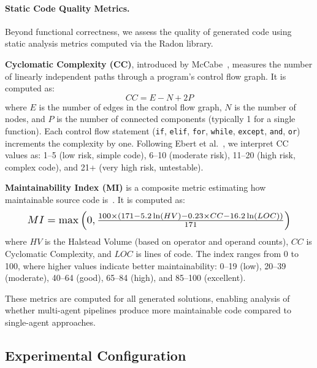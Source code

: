 \paragraph{Static Code Quality Metrics.} Beyond functional correctness, we assess the quality of generated code using static analysis metrics computed via the Radon library.

\textbf{Cyclomatic Complexity (CC)}, introduced by McCabe~\cite{mccabe1976complexity}, measures the number of linearly independent paths through a program's control flow graph. It is computed as:
\begin{equation}
    CC = E - N + 2P
\end{equation}
where $E$ is the number of edges in the control flow graph, $N$ is the number of nodes, and $P$ is the number of connected components (typically 1 for a single function). Each control flow statement (\texttt{if}, \texttt{elif}, \texttt{for}, \texttt{while}, \texttt{except}, \texttt{and}, \texttt{or}) increments the complexity by one. Following Ebert et al.~\cite{ebert2016cyclomatic}, we interpret CC values as: 1--5 (low risk, simple code), 6--10 (moderate risk), 11--20 (high risk, complex code), and 21+ (very high risk, untestable).

\textbf{Maintainability Index (MI)} is a composite metric estimating how maintainable source code is~\cite{microsoft2024maintainability}. It is computed as:
\begin{equation}
    \resizebox{0.89\columnwidth}{!}{%
    $MI = \max\left(0, \frac{100 \times (171 - 5.2 \ln(HV) - 0.23 \times CC - 16.2 \ln(LOC))}{171}\right)$%
    }
\end{equation}
where $HV$ is the Halstead Volume (based on operator and operand counts), $CC$ is Cyclomatic Complexity, and $LOC$ is lines of code. The index ranges from 0 to 100, where higher values indicate better maintainability: 0--19 (low), 20--39 (moderate), 40--64 (good), 65--84 (high), and 85--100 (excellent).

These metrics are computed for all generated solutions, enabling analysis of whether multi-agent pipelines produce more maintainable code compared to single-agent approaches.

\subsection{Experimental Configuration}
\label{subsec:configuration}


